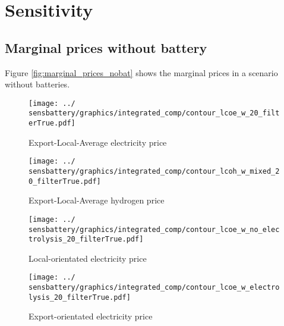 
\section{Sensitivity}

\subsection{Marginal prices without battery}
Figure \ref{fig:marginal_prices_nobat} shows the marginal prices in a scenario without batteries.

\begin{figure*}[h] %
    \centering
    \begin{subfigure}[b]{0.45\linewidth}
        \centering
        \texttt{[image: ../\\sensbattery/graphics/integrated\_comp/contour\_lcoe\_w\_20\_filterTrue.pdf]}
        \caption{Export-Local-Average electricity price}
        \label{fig:export_local_el_price}
    \end{subfigure}
    \hfill
    \begin{subfigure}[b]{0.45\linewidth}
        \centering
        \texttt{[image: ../\\sensbattery/graphics/integrated\_comp/contour\_lcoh\_w\_mixed\_20\_filterTrue.pdf]}
        \caption{Export-Local-Average hydrogen price}
        \label{fig:export_local_hy_price}
    \end{subfigure}
    \hfill
    \begin{subfigure}[b]{0.45\linewidth}
        \centering
        \texttt{[image: ../\\sensbattery/graphics/integrated\_comp/contour\_lcoe\_w\_no\_electrolysis\_20\_filterTrue.pdf]}
        \caption{Local-orientated electricity price}
        \label{fig:local_el_price_appendix_battery}
    \end{subfigure}
    \hfill
    \begin{subfigure}[b]{0.45\linewidth}
        \centering
        \texttt{[image: ../\\sensbattery/graphics/integrated\_comp/contour\_lcoe\_w\_electrolysis\_20\_filterTrue.pdf]}
        \caption{Export-orientated electricity price}
        \label{fig:export_el_price}
    \end{subfigure}
    \hfill

    \caption{Scenario: No batteries. Marginal prices of electricity and hydrogen subject to export volumes and emission limits depending on various weightings. Black lines indicate the lowest price at each emission limit.}
    \label{fig:marginal_prices_nobat}
\end{figure*}


